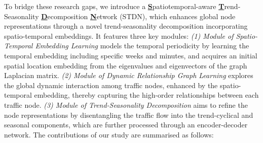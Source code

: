 To bridge these research gaps, we introduce a \textbf{\underline{S}}patiotemporal-aware \textbf{\underline{T}}rend-Seasonality \textbf{\underline{D}}ecomposition \textbf{\underline{N}}etwork (STDN), which enhances global node representations through a novel trend-seasonality decomposition incorporating spatio-temporal embeddings. It features three key modules: \textit{(1) Module of Spatio-Temporal Embedding Learning} models the temporal periodicity by learning the temporal embedding including specific weeks and minutes, and acquires an initial spatial location embedding from the eigenvalues and eigenvectors of the graph Laplacian matrix. \textit{(2) Module of Dynamic Relationship Graph Learning} explores the global dynamic interaction among traffic nodes, enhanced by the spatio-temporal embedding, thereby capturing the high-order relationships between each traffic node. \textit{(3) Module of Trend-Seasonality
Decomposition} aims to refine the node representations by disentangling the traffic flow into the trend-cyclical and seasonal components, which are further processed through an encoder-decoder network. The contributions of our study are summarised as follows: %

